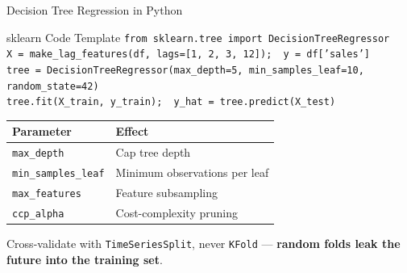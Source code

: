 \documentclass[aspectratio=169, 11pt]{beamer}
\begin{document}
\begin{frame}{Decision Tree Regression in Python}
  \begin{examplebox}{sklearn Code Template}
    {\scriptsize
    \texttt{from sklearn.tree import DecisionTreeRegressor}\\
    \texttt{X = make\_lag\_features(df, lags=[1, 2, 3, 12]);\ \ y = df['sales']}\\
    \texttt{tree = DecisionTreeRegressor(max\_depth=5, min\_samples\_leaf=10, random\_state=42)}\\
    \texttt{tree.fit(X\_train, y\_train);\ \ y\_hat = tree.predict(X\_test)}
    }
  \end{examplebox}
  \vspace{-0.15cm}
  \begin{center}
    {\footnotesize
    \begin{tabular}{ll}
      \toprule
      \textbf{Parameter} & \textbf{Effect} \\
      \midrule
      \texttt{max\_depth}         & Cap tree depth \\
      \texttt{min\_samples\_leaf} & Minimum observations per leaf \\
      \texttt{max\_features}      & Feature subsampling \\
      \texttt{ccp\_alpha}         & Cost-complexity pruning \\
      \bottomrule
    \end{tabular}
    }
  \end{center}
  \vspace{-0.15cm}
  {\small Cross-validate with \texttt{TimeSeriesSplit}, never \texttt{KFold} ---
  \textbf{random folds leak the future into the training set}.}
\end{frame}
\end{document}
